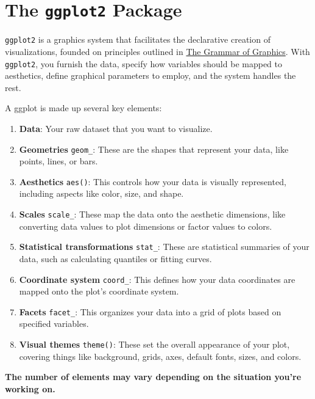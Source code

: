 \documentclass[
  letterpaper,
]{scrbook}
\providecommand{\tightlist}{%
  \setlength{\itemsep}{0pt}\setlength{\parskip}{0pt}}\usepackage{longtable,booktabs,array}
\begin{document}

\chapter{\texorpdfstring{The \texttt{ggplot2}
Package}{The ggplot2 Package}}\label{ggplot}

\texttt{ggplot2} is a graphics system that facilitates the declarative
creation of visualizations, founded on principles outlined in
\href{https://link.springer.com/chapter/10.1007/978-3-642-21551-3_13}{The
Grammar of Graphics}. With \texttt{ggplot2}, you furnish the data,
specify how variables should be mapped to aesthetics, define graphical
parameters to employ, and the system handles the rest.

A ggplot is made up several key elements:

\begin{enumerate}
\def\labelenumi{\arabic{enumi}.}
\tightlist
\item
  \textbf{Data}: Your raw dataset that you want to visualize.
\item
  \textbf{Geometries} \texttt{geom\_}: These are the shapes that
  represent your data, like points, lines, or bars.
\item
  \textbf{Aesthetics} \texttt{aes()}: This controls how your data is
  visually represented, including aspects like color, size, and shape.
\item
  \textbf{Scales} \texttt{scale\_}: These map the data onto the
  aesthetic dimensions, like converting data values to plot dimensions
  or factor values to colors.
\item
  \textbf{Statistical transformations} \texttt{stat\_}: These are
  statistical summaries of your data, such as calculating quantiles or
  fitting curves.
\item
  \textbf{Coordinate system} \texttt{coord\_}: This defines how your
  data coordinates are mapped onto the plot's coordinate system.
\item
  \textbf{Facets} \texttt{facet\_}: This organizes your data into a grid
  of plots based on specified variables.
\item
  \textbf{Visual themes} \texttt{theme()}: These set the overall
  appearance of your plot, covering things like background, grids, axes,
  default fonts, sizes, and colors.
\end{enumerate}

\begin{tcolorbox}[enhanced jigsaw, breakable, left=2mm, opacityback=0, leftrule=.75mm, bottomrule=.15mm, colback=white, colframe=quarto-callout-note-color-frame, arc=.35mm, rightrule=.15mm, toprule=.15mm]
\begin{minipage}[t]{5.5mm}
\textcolor{quarto-callout-note-color}{\faInfo}
\end{minipage}%
\begin{minipage}[t]{\textwidth - 5.5mm}

\textbf{The number of elements may vary depending on the situation
you're working on.}

\end{minipage}%
\end{tcolorbox}
\end{document}
